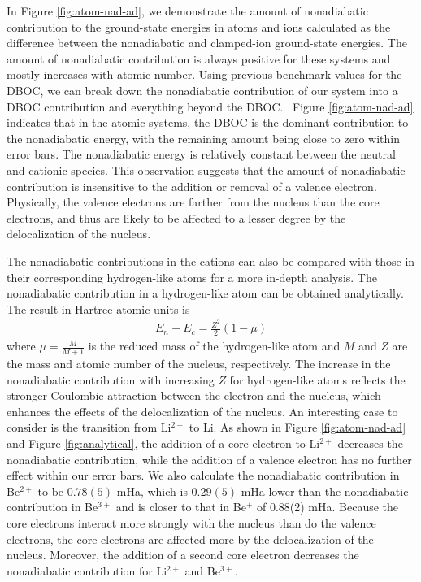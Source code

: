 \documentclass[aip,jcp,numerical,reprint]{revtex4-1}
\begin{document}
In Figure \ref{fig:atom-nad-ad}, we demonstrate the amount of nonadiabatic contribution to the ground-state energies in atoms and ions calculated as the difference between the nonadiabatic and clamped-ion ground-state energies. The amount of nonadiabatic contribution is always positive for these systems and mostly increases with atomic number. Using previous benchmark values for the DBOC, we can break down the nonadiabatic contribution of our system into a DBOC contribution and everything beyond the DBOC.~\cite{Klopper_DBOC,CFOUR,Harding} Figure \ref{fig:atom-nad-ad} indicates that in the atomic systems, the DBOC is the dominant contribution to the nonadiabatic energy, with the remaining amount being close to zero within error bars. The nonadiabatic energy is relatively constant between the neutral and cationic species. This observation suggests that the amount of nonadiabatic contribution is insensitive to the addition or removal of a valence electron. Physically, the valence electrons are farther from the nucleus than the core electrons, and thus are likely to be affected to a lesser degree by the delocalization of the nucleus. 

The nonadiabatic contributions in the cations can also be compared with those in their corresponding hydrogen-like atoms for a more in-depth analysis. The nonadiabatic contribution in a hydrogen-like atom can be obtained analytically. The result in Hartree atomic units is
\begin{align}
E_n-E_c=\frac{Z^2}{2}(1-\mu) \label{eq:analytical}
\end{align}
where $\mu=\frac{M}{M+1}$ is the reduced mass of the hydrogen-like atom and $M$ and $Z$ are the mass and atomic number of the nucleus, respectively. The increase in the nonadiabatic contribution with increasing $Z$ for hydrogen-like atoms reflects the stronger Coulombic attraction between the electron and the nucleus, which enhances the effects of the delocalization of the nucleus. An interesting case to consider is the transition from Li$^{2+}$ to Li. As shown in Figure \ref{fig:atom-nad-ad} and Figure \ref{fig:analytical}, the addition of a core electron to Li$^{2+}$ decreases the nonadiabatic contribution, while the addition of a valence electron has no further effect within our error bars. We also calculate the nonadiabatic contribution in Be$^{2+}$ to be $0.78(5)$ mHa, which is $0.29(5)$ mHa lower than the nonadiabatic contribution in Be$^{3+}$ and is closer to that in Be$^{+}$ of 0.88(2) mHa. Because the core electrons interact more strongly with the nucleus than do the valence electrons, the core electrons are affected more by the delocalization of the nucleus. Moreover, the addition of a second core electron decreases the nonadiabatic contribution for Li$^{2+}$ and Be$^{3+}$. %
\end{document}

